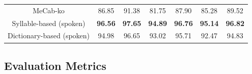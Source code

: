 \documentclass[AMS,STIX2COL]{WileyNJD-v2}
\begin{document}
\begin{table}[]
\begin{tabular*}{500pt}{@{\extracolsep\fill}c|cccccc@{\extracolsep\fill}}
            \midrule
            \hspace{2mm}MeCab-ko                   & 86.85                      & 91.38                        & 81.75                      & 87.90                        & 85.28                      & 89.52                        \\
            \hspace{2mm}Syllable-based (spoken)    & \textbf{96.56}             & \textbf{97.65}               & \textbf{94.89}             & \textbf{96.76}               & \textbf{95.14}             & \textbf{96.82}               \\
            \hspace{2mm}Dictionary-based (spoken)  & 94.98                      & 96.65                        & 93.02                      & 95.71                        & 92.47                      & 94.83                        \\
            \bottomrule
        \end{tabular*}
    \end{table}

    \subsection{Evaluation Metrics}\label{subsec5.2}
\end{document}
